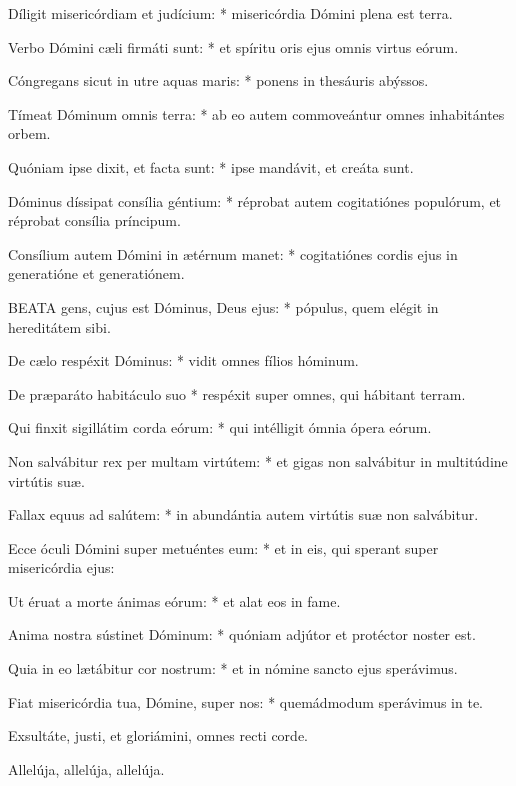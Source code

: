 Díligit misericórdiam et judícium: * misericórdia Dómini plena est terra.

Verbo Dómini cæli firmáti sunt: * et spíritu oris ejus omnis virtus eórum.

Cóngregans sicut in utre aquas maris: * ponens in thesáuris abýssos.

Tímeat Dóminum omnis terra: * ab eo autem commoveántur omnes inhabitántes orbem.

Quóniam ipse dixit, et facta sunt: * ipse mandávit, et creáta sunt.

Dóminus díssipat consília géntium: * réprobat autem cogitatiónes populórum, et réprobat consília príncipum.

Consílium autem Dómini in ætérnum manet: * cogitatiónes cordis ejus in generatióne et generatiónem.


\lettrine[lines=2]{B}{EATA} gens, cujus est Dóminus, Deus ejus: * pópulus, quem elégit in hereditátem sibi.

De cælo respéxit Dóminus: * vidit omnes fílios hóminum.

De præparáto habitáculo suo * respéxit super omnes, qui hábitant terram.

Qui finxit sigillátim corda eórum: * qui intélligit ómnia ópera eórum.

Non salvábitur rex per multam virtútem: * et gigas non salvábitur in multitúdine virtútis suæ.

Fallax equus ad salútem: * in abundántia autem virtútis suæ non salvábitur.

Ecce óculi Dómini super metuéntes eum: * et in eis, qui sperant super misericórdia ejus:

Ut éruat a morte ánimas eórum: * et alat eos in fame.

Anima nostra sústinet Dóminum: * quóniam adjútor et protéctor noster est.

Quia in eo lætábitur cor nostrum: * et in nómine sancto ejus sperávimus.

Fiat misericórdia tua, Dómine, super nos: * quemádmodum sperávimus in te.

  Exsultáte, justi, et gloriámini, omnes recti corde.

  Allelúja, allelúja, allelúja.



